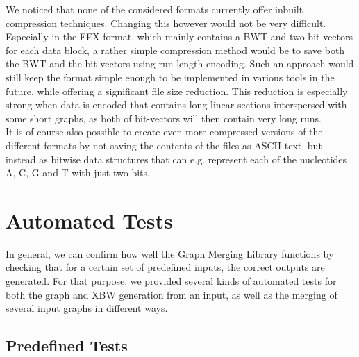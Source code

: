 \documentclass[a4paper,12pt,twoside,BCOR=10mm]{scrbook}
\begin{document}
We noticed that none of the considered formats currently offer inbuilt compression techniques. 
Changing this however would not be very difficult. Especially in the FFX format, 
which mainly contains a BWT and two bit-vectors for each data block, 
a rather simple compression method would be to save both the BWT and the bit-vectors 
using run-length encoding. 
Such an approach would still keep the format simple enough to be implemented in various 
tools in the future, while offering a significant file size reduction. 
This reduction is especially strong when data is encoded that contains long linear sections 
interspersed with some short graphs, as both of bit-vectors will then 
contain very long runs. \\
It is of course also possible to create even more compressed versions 
of the different formats by not saving the contents of the files as ASCII text, 
but instead as bitwise data structures that can e.g. represent each of the nucleotides A, C, G and T with 
just two bits.

\section{Automated Tests}
%

In general, we can confirm how well the Graph Merging Library functions by checking 
that for a certain set of predefined inputs, the correct outputs are generated. 
For that purpose, we provided several kinds of automated tests for both the 
graph and XBW generation from an input, as well as the merging of several input graphs 
in different ways.

\subsection{Predefined Tests}
\end{document}
